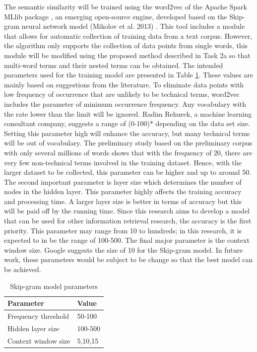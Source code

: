 \documentclass[Journal, InsideFigs, DoubleSpace]{ascelike} %
\begin{document}
The semantic similarity will be trained using the word2vec of the Apache Spark MLlib package \cite{apache16}, an emerging open-source engine, developed based on the Skip-gram neural network model (Mikolov et al. 2013) \cite{mikolov13a}. This tool includes a module that allows for automatic collection of training data from a text corpus. However, the algorithm only supports the collection of data points from single words, this module will be modified using the proposed method described in Task 2a so that multi-word terms and their nested terms can be obtained. The intended parameters used for the training model are presented in Table \ref{table:nn-parameters}. These values are mainly based on suggestions from the literature. To eliminate data points with low frequency of occurrence that are unlikely to be technical terms, word2vec includes the parameter of minimum occurrence frequency. Any vocabulary with the rate lower than the limit will be ignored. Radim Rehurek, a machine learning consultant company, suggests a range of (0-100)* depending on the data set size. Setting this parameter high will enhance the accuracy, but many technical terms will be out of vocabulary. The preliminary study based on the preliminary corpus with only several millions of words shows that with the frequency of 20, there are very few non-technical terms involved in the training dataset. Hence, with the larger dataset to be collected, this parameter can be higher and up to around 50. The second important parameter is layer size which determines the number of nodes in the hidden layer. This parameter highly affects the training accuracy and processing time. A larger layer size is better in terms of accuracy but this will be paid off by the running time. Since this research aims to develop a model that can be used for other information retrieval research, the accuracy is the first priority. This parameter may range from 10 to hundreds; in this research, it is expected to in be the range of 100-500. The final major parameter is the context window size. Google  suggests the size of 10 for the Skip-gram model. In future work, these parameters would be subject to be change so that the best model can be achieved. 
%
\begin{table} [t]
\caption{Skip-gram model parameters}
\label{table:nn-parameters}
\centering
\small
\renewcommand{\arraystretch}{1.25}
\begin{tabular}{l l}
\hline
\textbf{Parameter} & \textbf{Value}\\
\hline
Frequency threshold & 50-100\\
Hidden layer size		&	100-500\\
Context window size	&	5,10,15\\
\hline
\end{tabular}
\normalsize
\end{table}
\end{document}
